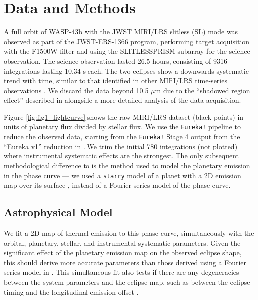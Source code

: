 \documentclass[twocolumn]{aastex631}
\begin{document}
\section{Data and Methods} \label{sec:methods}

A full orbit of WASP-43b with the JWST MIRI/LRS slitless (SL) mode was observed as part of the JWST-ERS-1366 program, performing target acquisition with the F1500W filter and using the SLITLESSPRISM subarray for the science observation. The science observation lasted 26.5 hours, consisting of 9316 integrations lasting 10.34 s each. The two eclipses show a downwards systematic trend with time, similar to that identified in other MIRI/LRS time-series observations \citep{bouwman2023spectroscopic}. We discard the data beyond 10.5 $\mu$m due to the ``shadowed region effect'' described in \citet{bell2023wasp43b} alongside a more detailed analysis of the data acquisition.

Figure \ref{fig:fig1_lightcurve} shows the raw MIRI/LRS dataset (black points) in units of planetary flux divided by stellar flux. We use the \texttt{Eureka!} pipeline \citep{bell2022eureka} to reduce the observed data, starting from the \texttt{Eureka!} Stage 4 output from the ``Eureka v1'' reduction in \citet{bell2023wasp43b}. We trim the initial 780 integrations (not plotted) where instrumental systematic effects are the strongest. The only subsequent methodological difference to \citet{bell2023wasp43b} is the method used to model the planetary emission in the phase curve --- we used a \texttt{starry} model of a planet with a 2D emission map over its surface \citep{luger2019starry}, instead of a Fourier series model of the phase curve.

\subsection{Astrophysical Model}\label{sec:methods:astro_model}

We fit a 2D map of thermal emission to this phase curve, simultaneously with the orbital, planetary, stellar, and instrumental systematic parameters. Given the significant effect of the planetary emission map on the observed eclipse shape, this should derive more accurate parameters than those derived using a Fourier series model in \citet{bell2023wasp43b}. This simultaneous fit also tests if there are any degeneracies between the system parameters and the eclipse map, such as between the eclipse timing and the longitudinal emission offset \citep{williams2006resolving}. 
\end{document}
